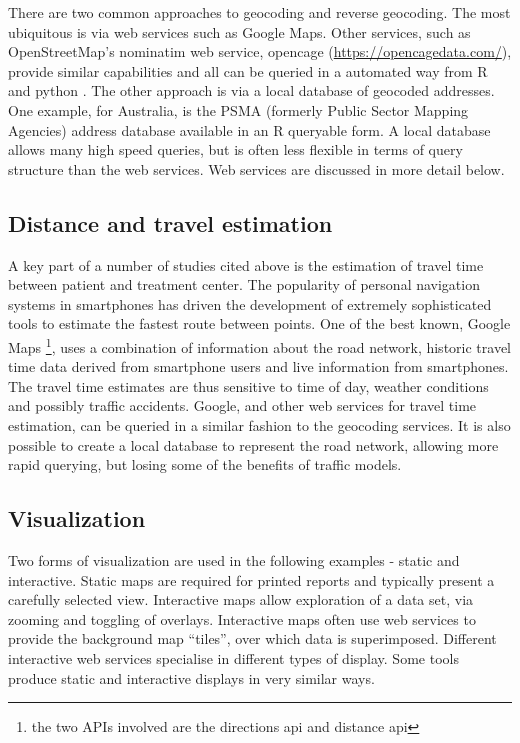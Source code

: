 \documentclass[utf8]{frontiersHLTH}
\begin{document}
There are two common approaches to geocoding and reverse geocoding. The
most ubiquitous is via web services such as Google Maps. Other services,
such as OpenStreetMap's nominatim web service, opencage
(\url{https://opencagedata.com/}), provide similar capabilities and all
can be queried in a automated way from R and python \cite{opencage}. The
other approach is via a local database of geocoded addresses. One
example, for Australia, is the PSMA (formerly Public Sector Mapping
Agencies) address database available in an R queryable form. A local
database allows many high speed queries, but is often less flexible in
terms of query structure than the web services. Web services are
discussed in more detail below.

\subsection{Distance and travel
estimation}\label{distance-and-travel-estimation}

A key part of a number of studies cited above is the estimation of
travel time between patient and treatment center. The popularity of
personal navigation systems in smartphones has driven the development of
extremely sophisticated tools to estimate the fastest route between
points. One of the best known, Google Maps \footnote{the two APIs
involved are the directions api and distance api}, uses a combination
of information about the road network, historic travel time data derived
from smartphone users and live information from smartphones. The travel
time estimates are thus sensitive to time of day, weather conditions and
possibly traffic accidents. Google, and other web services for travel
time estimation, can be queried in a similar fashion to the geocoding
services. It is also possible to create a local database to represent
the road network, allowing more rapid querying, but losing some of the
benefits of traffic models.

\subsection{Visualization}\label{visualization}

Two forms of visualization are used in the following examples - static
and interactive. Static maps are required for printed reports and
typically present a carefully selected view. Interactive maps allow
exploration of a data set, via zooming and toggling of overlays.
Interactive maps often use web services to provide the background map
``tiles'', over which data is superimposed. Different interactive web
services specialise in different types of display. Some tools produce
static and interactive displays in very similar ways.
\end{document}
